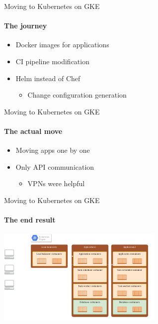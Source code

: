 \documentclass[17pt]{beamer}
\begin{document}
  \begin{frame}{Moving to Kubernetes on GKE}
  \framesubtitle{The journey}
  \begin{itemize}
    \item Docker images for applications
    \item CI pipeline modification
    \item Helm instead of Chef
    \begin{itemize}
      \item Change configuration generation
    \end{itemize}
  \end{itemize}
  \end{frame}

  \begin{frame}{Moving to Kubernetes on GKE}
  \framesubtitle{The actual move}
  \begin{itemize}
    \item Moving apps one by one
    \item Only API communication
    \begin{itemize}
      \item VPNs were helpful
    \end{itemize}
  \end{itemize}
  \end{frame}

  \begin{frame}{Moving to Kubernetes on GKE}
  \framesubtitle{The end result}
  \centering
  \includegraphics[width=8cm]{images/kubernetes_diagram.png}
  \end{frame}
\end{document}
